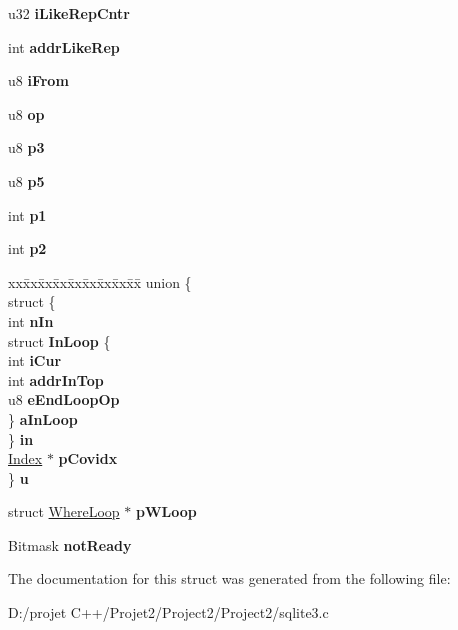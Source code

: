 \begin{DoxyCompactItemize}
u32 {\bfseries i\+Like\+Rep\+Cntr}
\item 
\mbox{\label{struct_where_level_a903c5abe2bf15929b51a1d0921782531}} 
int {\bfseries addr\+Like\+Rep}
\item 
\mbox{\label{struct_where_level_a4d8e905640b12a5075ff5e2f395876dd}} 
u8 {\bfseries i\+From}
\item 
\mbox{\label{struct_where_level_a0253c213b81cd17481601e495d421706}} 
u8 {\bfseries op}
\item 
\mbox{\label{struct_where_level_a350b6471be36b98926c357c75658865f}} 
u8 {\bfseries p3}
\item 
\mbox{\label{struct_where_level_a568ee11c7ecabb4259836ccc11025ae6}} 
u8 {\bfseries p5}
\item 
\mbox{\label{struct_where_level_ad544492b3388cb82a4b3674e6c1fdb07}} 
int {\bfseries p1}
\item 
\mbox{\label{struct_where_level_a9c60432a75f2252764e78128e4dad19b}} 
int {\bfseries p2}
\item 
\mbox{\label{struct_where_level_a17c821cdd25a9de93a9c929bde733e83}} 
\begin{tabbing}
xx\=xx\=xx\=xx\=xx\=xx\=xx\=xx\=xx\=\kill
union \{\\
\>struct \{\\
\>\>int {\bfseries nIn}\\
\>\>struct {\bfseries InLoop} \{\\
\>\>\>int {\bfseries iCur}\\
\>\>\>int {\bfseries addrInTop}\\
\>\>\>u8 {\bfseries eEndLoopOp}\\
\>\>\} {\bfseries aInLoop}\\
\>\} {\bfseries in}\\
\>\mbox{\hyperlink{struct_index}{Index}} $\ast$ {\bfseries pCovidx}\\
\} {\bfseries u}\\

\end{tabbing}\item 
\mbox{\label{struct_where_level_ac40ed0531ae966eabe77e10f29fb56f3}} 
struct \mbox{\hyperlink{struct_where_loop}{Where\+Loop}} $\ast$ {\bfseries p\+W\+Loop}
\item 
\mbox{\label{struct_where_level_aed1e0964182444c84ceaad061acc473c}} 
Bitmask {\bfseries not\+Ready}
\end{DoxyCompactItemize}


The documentation for this struct was generated from the following file\+:\begin{DoxyCompactItemize}
\item 
D\+:/projet C++/\+Projet2/\+Project2/\+Project2/sqlite3.\+c\end{DoxyCompactItemize}

